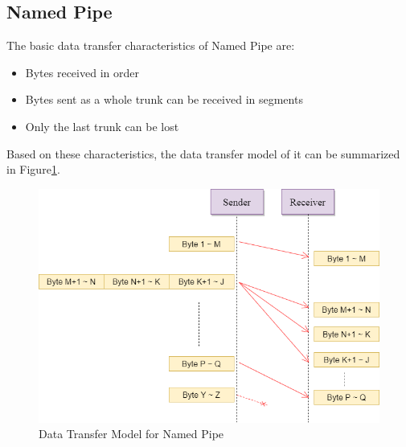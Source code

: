 \subsection{Named Pipe}
The basic data transfer characteristics of Named Pipe are:
\begin{itemize}
  \item Bytes received in order
  \item Bytes sent as a whole trunk can be received in segments
  \item Only the last trunk can be lost
\end{itemize}
Based on these characteristics, the data transfer model of it can be summarized in Figure\ref{namedpipe}. 
\begin{figure}[H]
\centerline{\includegraphics[scale=0.48]{Figures/namedpipe}}
\caption{Data Transfer Model for Named Pipe}
\label{namedpipe}
\end{figure}

